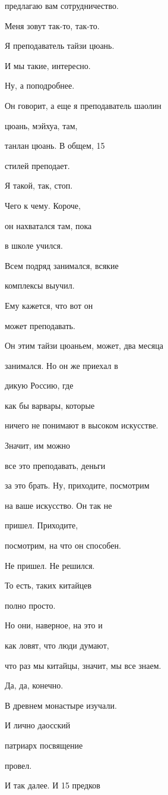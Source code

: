предлагаю вам сотрудничество.

Меня зовут так-то, так-то.

Я преподаватель тайзи цюань.

И мы такие, интересно.

Ну, а поподробнее.

Он говорит, а еще я преподаватель шаолин

цюань, мэйхуа, там,

танлан цюань. В общем, 15

стилей преподает.

Я такой, так, стоп.

Чего к чему. Короче,

он нахватался там, пока

в школе учился.

Всем подряд занимался, всякие

комплексы выучил.

Ему кажется, что вот он

может преподавать.

Он этим тайзи цюаньем, может, два месяца

занимался. Но он же приехал в

дикую Россию, где

как бы варвары, которые

ничего не понимают в высоком искусстве.

Значит, им можно

все это преподавать, деньги

за это брать. Ну, приходите, посмотрим

на ваше искусство. Он так не

пришел. Приходите,

посмотрим, на что он способен.

Не пришел. Не решился.

То есть, таких китайцев

полно просто.

Но они, наверное, на это и

как ловят, что люди думают,

что раз мы китайцы, значит, мы все знаем.

Да, да, конечно.

В древнем монастыре изучали.

И лично даосский

патриарх посвящение

провел.

И так далее. И 15 предков

